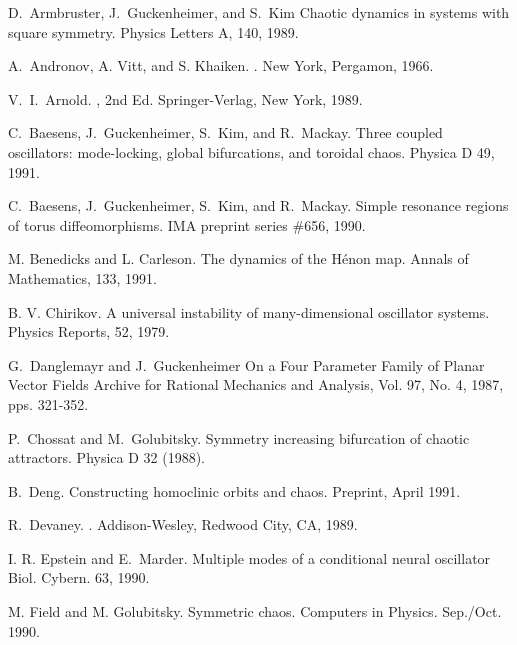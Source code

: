 \begin{thebibliography}{99}

D.~Armbruster, J.~Guckenheimer, and S.~Kim
\newblock Chaotic dynamics in systems with square symmetry.
\newblock Physics Letters A, 140, 1989.

A.~Andronov, A. Vitt, and S. Khaiken.
.
\newblock New York, Pergamon, 1966.

V.~I.~Arnold.
, 2nd Ed.
\newblock Springer-Verlag, New York, 1989.

C.~Baesens, J.~Guckenheimer, S.~Kim, and R.~Mackay.
\newblock Three coupled oscillators: mode-locking, global
bifurcations, and toroidal chaos.
\newblock Physica D 49, 1991.

C.~Baesens, J.~Guckenheimer, S.~Kim, and R.~Mackay.
\newblock Simple resonance regions of torus diffeomorphisms.
\newblock IMA preprint series \#656, 1990.

M. Benedicks and L. Carleson.
\newblock The dynamics of the H\'{e}non map.
\newblock Annals of Mathematics, 133, 1991.

B. V. Chirikov.
\newblock A universal instability of many-dimensional oscillator
systems.
\newblock Physics Reports, 52, 1979.

G.~Danglemayr and J.~Guckenheimer
\newblock On a Four Parameter Family of Planar Vector Fields
\newblock Archive for Rational Mechanics and Analysis, Vol. 97, No. 4, 1987, pps. 321-352.

P.~Chossat and M.~Golubitsky. 
\newblock Symmetry increasing bifurcation of chaotic attractors. 
\newblock Physica D 32 (1988).

B.~Deng.
\newblock Constructing homoclinic orbits and chaos.
\newblock Preprint, April 1991.

R.~Devaney.
.
\newblock  Addison-Wesley, Redwood City, CA, 1989.

I. R. Epstein and E.~Marder.
\newblock Multiple modes of a conditional neural oscillator
\newblock Biol. Cybern. 63, 1990.

M. Field and M. Golubitsky.
\newblock Symmetric chaos.  
\newblock Computers in Physics.   Sep./Oct. 1990.


\end{thebibliography}
